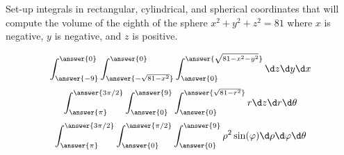 \documentclass{ximera}
\author{Bart Snapp}
\begin{document}
\begin{exercise}
  Set-up integrals in rectangular, cylindrical, and spherical
  coordinates that will compute the volume of the eighth of the sphere
  $x^2+y^2+z^2 = 81$ where $x$ is negative, $y$ is negative, and $z$ is positive.
  \begin{prompt}
  \[
  \int_{\answer{-9}}^{\answer{0}}\int_{\answer{-\sqrt{81-x^2}}}^{\answer{0}}\int_{\answer{0}}^{\answer{\sqrt{81-x^2-y^2}}}\d z \d y \d x
  \]
  \[
  \int_{\answer{\pi}}^{\answer{3\pi/2}}\int_{\answer{0}}^{\answer{9}}\int_{\answer{0}}^{\answer{\sqrt{81-r^2}}}   r\d z \d r \d \theta
  \]
  \[
  \int_{\answer{\pi}}^{\answer{3\pi/2}}\int_{\answer{0}}^{\answer{\pi/2}}\int_{\answer{0}}^{\answer{9}}   \rho^2\sin(\varphi)\d \rho \d \varphi \d \theta
  \]
  \end{prompt}
\end{exercise}
\end{document}

